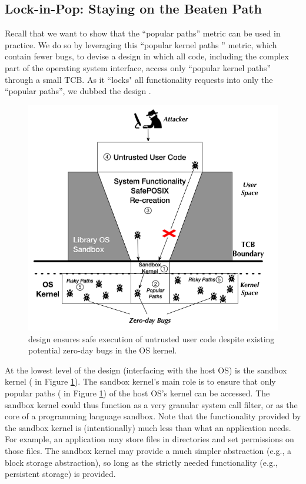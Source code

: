 \subsection{Lock-in-Pop: Staying on the Beaten Path}
\label{lock-in-pop}

Recall that we want to show that the ``popular paths'' metric can be used in practice. 
We do so by leveraging this ``popular kernel paths '' metric, which contain fewer bugs, to devise a design
in which all code, including the complex part
of the operating system interface, access only
``popular kernel paths'' through a small TCB. As it ``locks" all functionality
requests into only the ``popular paths'', we dubbed the design \lip.

\begin{figure}%
\centering
\includegraphics[width=1.0\columnwidth]{diagram/Virtualization_Design_Model_01.png}
\caption{\small \lip design ensures safe execution of untrusted user code
despite existing potential zero-day bugs in the OS kernel.}
\label{fig:design_safe_reimplementation}
\end{figure}

At the lowest level of the design (interfacing with the host OS) is the
sandbox kernel ( in Figure \ref{fig:design_safe_reimplementation}).
The sandbox kernel's main role is to ensure that only popular paths ( in Figure \ref{fig:design_safe_reimplementation})
of the host OS's kernel can be accessed. 
The sandbox kernel could thus function as a very granular system call filter, or
as the core of a programming language sandbox. Note that the functionality
provided by the sandbox kernel is (intentionally) much less than what
an application needs. For example, an application may store files in directories and set permissions on those files.
The sandbox kernel may provide a much simpler abstraction (e.g., a block storage abstraction),
so long as the strictly needed functionality (e.g., persistent storage) is provided.

